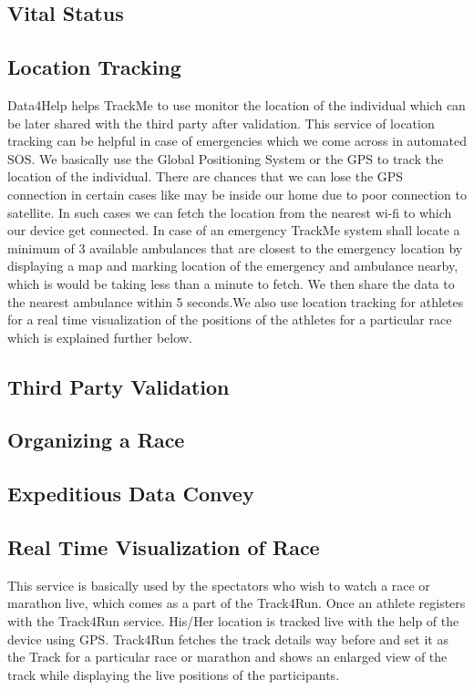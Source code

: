 \subsection{Vital Status}


\subsection{Location Tracking}
\qquad Data4Help helps TrackMe to use monitor the location of the individual which can be later shared with the third party after validation. This service of location tracking can be helpful in case of emergencies which we come across in automated SOS. We basically use the Global Positioning System or the GPS to track the location of the individual. There are chances that we can lose the GPS connection in certain cases like may be inside our home due to poor connection to satellite. In such cases we can fetch the location from the nearest wi-fi to which our device get connected. In case of an emergency TrackMe system shall locate a minimum of 3 available ambulances that are closest to the emergency location by displaying a map and marking location of the emergency and ambulance nearby, which is would be taking less than a minute to fetch. We then share the data to the nearest ambulance within 5 seconds.We also use location tracking for athletes for a real time visualization of the positions of the athletes for a particular race which is explained further below.


\subsection{Third Party Validation}

\subsection{Organizing a Race}

\subsection{Expeditious Data Convey}

\subsection{Real Time Visualization of Race}
\qquad This service is basically used by the spectators who wish to watch a race or marathon live, which comes as a part of the Track4Run. Once an athlete registers with the Track4Run service. His/Her location is tracked live with the help of the device using GPS. Track4Run fetches the track details way before and set it as the Track for a particular race or marathon and shows an enlarged view of the track while displaying the live positions of the participants.